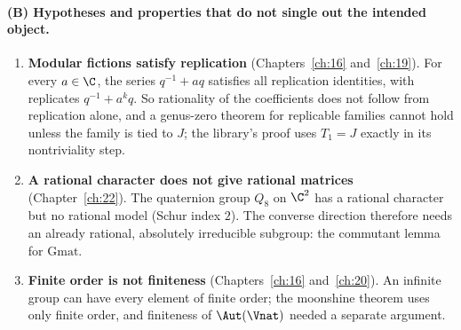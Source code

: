 \paragraph{(B) Hypotheses and properties that do not single out the intended object.}
\begin{enumerate}
\item \textbf{Modular fictions satisfy replication} (Chapters~\ref{ch:16} and~\ref{ch:19}). For every $a\in\C$, the series
  $q^{-1}+aq$ satisfies all replication identities, with replicates $q^{-1}+a^kq$. So rationality of the coefficients does
  not follow from replication alone, and a genus-zero theorem for replicable families cannot hold unless the family is
  tied to $J$; the library's proof uses $T_1=J$ exactly in its nontriviality step.
\item \textbf{A rational character does not give rational matrices} (Chapter~\ref{ch:22}). The quaternion group $Q_8$ on
  $\C^2$ has a rational character but no rational model (Schur index $2$). The converse direction therefore needs an
  already rational, absolutely irreducible subgroup: the commutant lemma for $\mathrm{Gmat}$.
\item \textbf{Finite order is not finiteness} (Chapters~\ref{ch:16} and~\ref{ch:20}). An infinite group can have every
  element of finite order; the moonshine theorem uses only finite order, and finiteness of $\Aut(\Vnat)$ needed a
  separate argument.
\end{enumerate}

